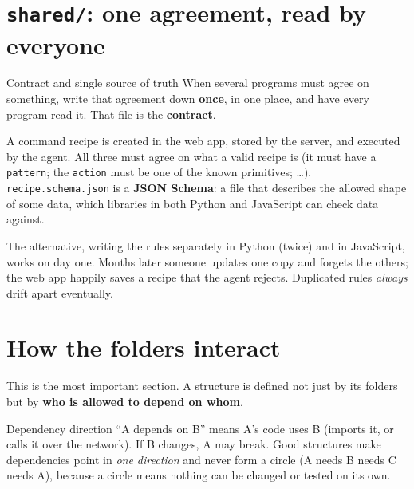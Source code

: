 \documentclass[11pt,a4paper]{article}
\begin{document}
\section{\texttt{shared/}: one agreement, read by everyone}\label{sec:shared}

\begin{concept}{Contract and single source of truth}
When several programs must agree on something, write that agreement down \textbf{once}, in
one place, and have every program read it. That file is the \textbf{contract}.
\end{concept}

A command recipe is created in the web app, stored by the server, and executed by the agent.
All three must agree on what a valid recipe is (it must have a \texttt{pattern}; the
\texttt{action} must be one of the known primitives; \ldots). \texttt{recipe.schema.json} is
a \textbf{JSON Schema}: a file that describes the allowed shape of some data, which libraries
in both Python and JavaScript can check data against.

\begin{caution}
The alternative, writing the rules separately in Python (twice) and in JavaScript, works on
day one. Months later someone updates one copy and forgets the others; the web app happily
saves a recipe that the agent rejects. Duplicated rules \emph{always} drift apart eventually.
\end{caution}

\section{How the folders interact}

This is the most important section. A structure is defined not just by its folders but by
\textbf{who is allowed to depend on whom}.

\begin{concept}{Dependency direction}
``A depends on B'' means A's code uses B (imports it, or calls it over the network). If B
changes, A may break. Good structures make dependencies point in \emph{one direction} and
never form a circle (A needs B needs C needs A), because a circle means nothing can be
changed or tested on its own.
\end{concept}
\end{document}
